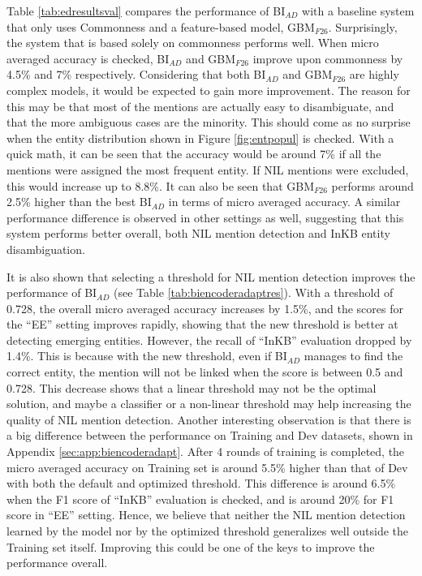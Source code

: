 \documentclass{report}
\theoremstyle{definition}
\theoremstyle{remark}
\begin{document}
Table \ref{tab:edresultsval} compares the performance of BI$_{AD}$ with a baseline system that only uses Commonness and a feature-based model, GBM$_{F26}$. Surprisingly, the system that is based solely on commonness performs well. When micro averaged accuracy is checked, BI$_{AD}$ and GBM$_{F26}$ improve upon commonness by 4.5\% and 7\% respectively. Considering that both BI$_{AD}$ and GBM$_{F26}$ are highly complex models, it would be expected to gain more improvement. The reason for this may be that most of the mentions are actually easy to disambiguate, and that the more ambiguous cases are the minority. This should come as no surprise when the entity distribution shown in Figure \ref{fig:entpopul} is checked. With a quick math, it can be seen that the accuracy would be around 7\% if all the mentions were assigned the most frequent entity. If NIL mentions were excluded, this would increase up to 8.8\%. It can also be seen that GBM$_{F26}$ performs around 2.5\% higher than the best BI$_{AD}$ in terms of micro averaged accuracy. A similar performance difference is observed in other settings as well, suggesting that this system performs better overall, both NIL mention detection and InKB entity disambiguation.

It is also shown that selecting a threshold for NIL mention detection improves the performance of BI$_{AD}$ (see Table \ref{tab:biencoderadaptres}). With a threshold of 0.728, the overall micro averaged accuracy increases by 1.5\%, and the scores for the ``EE'' setting improves rapidly, showing that the new threshold is better at detecting emerging entities. However, the recall of ``InKB'' evaluation dropped by 1.4\%. This is because with the new threshold, even if BI$_{AD}$ manages to find the correct entity, the mention will not be linked when the score is between 0.5 and 0.728. This decrease shows that a linear threshold may not be the optimal solution, and maybe a classifier or a non-linear threshold may help increasing the quality of NIL mention detection. Another interesting observation is that there is a big difference between the performance on Training and Dev datasets, shown in Appendix \ref{sec:app:biencoderadapt}. After 4 rounds of training is completed, the micro averaged accuracy on Training set is around 5.5\% higher than that of Dev with both the default and optimized threshold. This difference is around 6.5\% when the F1 score of ``InKB'' evaluation is checked, and is around 20\% for F1 score in ``EE'' setting. Hence, we believe that neither the NIL mention detection learned by the model nor by the optimized threshold generalizes well outside the Training set itself. Improving this could be one of the keys to improve the performance overall.
\end{document}
